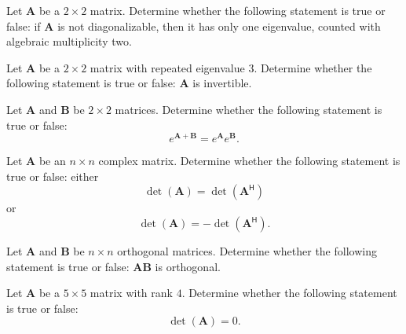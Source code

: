\documentclass[11pt,oneside]{article}
\begin{document}
\begin{problem}
Let $\mathbf A$ be a $2\times2$ matrix. Determine whether the following statement is true or false: if $\mathbf A$ is not diagonalizable, then it has only one eigenvalue, counted with algebraic multiplicity two.
\end{problem}

\begin{problem}
Let $\mathbf A$ be a $2\times2$ matrix with repeated eigenvalue $3$. Determine whether the following statement is true or false: $\mathbf A$ is invertible.
\end{problem}

\begin{problem}
Let $\mathbf A$ and $\mathbf B$ be $2\times2$ matrices. Determine whether the following statement is true or false:
\[
e^{\mathbf A+\mathbf B}=e^{\mathbf A}e^{\mathbf B}.
\]
\end{problem}

\begin{problem}
Let $\mathbf A$ be an $n\times n$ complex matrix. Determine whether the following statement is true or false: either
\[
\det(\mathbf A)=\det(\mathbf A^{\mathsf H})
\]
or
\[
\det(\mathbf A)=-\det(\mathbf A^{\mathsf H}).
\]
\end{problem}

\begin{problem}
Let $\mathbf A$ and $\mathbf B$ be $n\times n$ orthogonal matrices. Determine whether the following statement is true or false: $\mathbf A\mathbf B$ is orthogonal.
\end{problem}

\begin{problem}
Let $\mathbf A$ be a $5\times5$ matrix with rank $4$. Determine whether the following statement is true or false:
\[
\det(\mathbf A)=0.
\]
\end{problem}
\end{document}
